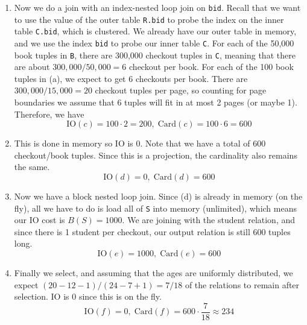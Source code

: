 \begin{example}
\begin{enumerate}
      \item[c)] Now we do a join with an index-nested loop join on \texttt{bid}. Recall that we want to use the value of the outer table \texttt{R.bid} to probe the index on the inner table \texttt{C.bid}, which is clustered. We already have our outer table in memory, and we use the index \texttt{bid} to probe our inner table \texttt{C}. For each of the 50,000 book tuples in \texttt{B}, there are 300,000 checkout tuples in \texttt{C}, meaning that there are about $300,000/50,000 = 6$ checkout per book. For each of the 100 book tuples in (a), we expect to get 6 checkouts per book. There are $300,000 / 15,000 = 20$ checkout tuples per page, so counting for page boundaries we assume that 6 tuples will fit in at most 2 pages (or maybe 1). Therefore, we have 
        \begin{equation}
          \mathrm{IO}(c) = 100 \cdot 2 = 200, \; \mathrm{Card}(c) = 100 \cdot 6 = 600
        \end{equation}

      \item[d)] This is done in memory so IO is $0$. Note that we have a total of 600 checkout/book tuples. Since this is a projection, the cardinality also remains the same. 
        \begin{equation}
          \mathrm{IO}(d) = 0, \; \mathrm{Card}(d) = 600 
        \end{equation}

      \item[e)] Now we have a block nested loop join. Since (d) is already in memory (on the fly), all we have to do is load all of \texttt{S} into memory (unlimited), which means our IO cost is $B(S) = 1000$. We are joining with the student relation, and since there is 1 student per checkout, our output relation is still 600 tuples long. 
        \begin{equation}
          \mathrm{IO}(e) = 1000, \; \mathrm{Card}(e) = 600
        \end{equation}

      \item[f)] Finally we select, and assuming that the ages are uniformly distributed, we expect $(20 - 12 - 1)/ (24 - 7 + 1) = 7/18$ of the relations to remain after selection. IO is $0$ since this is on the fly. 
        \begin{equation}
          \mathrm{IO}(f) = 0, \; \mathrm{Card}(f) = 600 \cdot \frac{7}{18} \approx 234
        \end{equation}


\end{enumerate}
\end{example}
